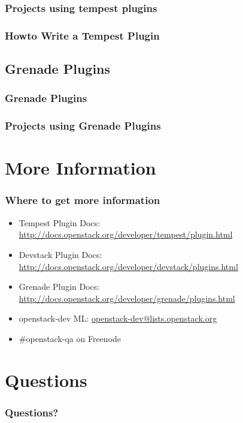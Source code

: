 \documentclass[aspectratio=169,11pt,hyperref={colorlinks=true}]{beamer}
\begin{document}
\begin{frame}
    \frametitle{Projects using tempest plugins}

\end{frame}

\begin{frame}
    \frametitle{Howto Write a Tempest Plugin}

\end{frame}

\subsection{Grenade Plugins}
\begin{frame}
    \frametitle{Grenade Plugins}
\end{frame}

\begin{frame}
\frametitle{Projects using Grenade Plugins}

\end{frame}

\section{More Information}
\begin{frame}
\frametitle{Where to get more information}
    \begin{itemize}
        \item Tempest Plugin Docs: \href{http://docs.openstack.org/developer/tempest/plugin.html}{http://docs.openstack.org/developer/tempest/plugin.html}
        \item Devstack Plugin Docs: \href{http://docs.openstack.org/developer/devstack/plugins.html}{http://docs.openstack.org/developer/devstack/plugins.html}
        \item Grenade Plugin Docs: \href{http://docs.openstack.org/developer/grenade/plugins.html}{http://docs.openstack.org/developer/grenade/plugins.html}
        \item openstack-dev ML: \href{mailto:openstack-dev@lists.openstack.org}{openstack-dev@lists.openstack.org}
        \item \#openstack-qa on Freenode
    \end{itemize}
\end{frame}

\section{Questions}
\begin{frame}
\frametitle{Questions?}
\end{frame}

\end{document}

